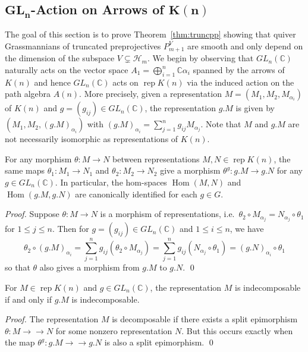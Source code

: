 \documentclass[smallextended,envcountsect,envcountsame]{svjour3}
\numberwithin{equation}{section}
\newcommand{\CC}{\mathbb{C}}
\newcommand{\cH}{\mathcal{H}}
\newcommand{\onto}{\to\!\!\!\!\!\to}
\newcommand{\Hom}{\operatorname{Hom}}
\newcommand{\rep}{\operatorname{rep}}
\begin{document}
\subsection{\texorpdfstring{$\mathbf{GL_n}$}{Gln}-Action on Arrows of \texorpdfstring{$\mathbf{K(n)}$}{K(n)}}

The goal of this section is to prove Theorem~\ref{thm:truncpp} showing that quiver Grassmannians of truncated preprojectives $P_{m+1}^V$ are smooth and only depend on the dimension of the subspace $V\subsetneq \cH_m$.
We begin by observing that $GL_n(\CC)$ naturally acts on the vector space $A_1=\bigoplus_{i=1}^n \CC\alpha_i$ spanned by the arrows of $K(n)$ and hence $GL_n(\CC)$ acts on $\rep K(n)$ via the induced action on the path algebra $A(n)$.
More precisely, given a representation $M=(M_1,M_2,M_{\alpha_i})$ of $K(n)$ and $g=(g_{ij})\in GL_n(\CC)$, the representation $g.M$ is given by $(M_1,M_2,(g.M)_{\alpha_i})$ with $(g.M)_{\alpha_i}=\sum\limits_{j=1}^n g_{ij}M_{\alpha_j}$.
Note that $M$ and $g.M$ are not necessarily isomorphic as representations of $K(n)$.
\begin{lemma}
  \label{le:hom equivariance}
  For any morphism $\theta:M\to N$ between representations $M,N\in\rep K(n)$, the same maps $\theta_1:M_1\to N_1$ and $\theta_2:M_2\to N_2$ give a morphism $\theta^g:g.M\to g.N$ for any $g\in GL_n(\CC)$.
  In particular, the hom-spaces $\Hom(M,N)$ and $\Hom(g.M,g.N)$ are canonically identified for each $g\in G$.
\end{lemma}
\begin{proof}
  Suppose $\theta:M\to N$ is a morphism of representations, i.e.\ $\theta_2\circ M_{\alpha_j}=N_{\alpha_j}\circ\theta_1$ for $1\le j\le n$.
  Then for $g=(g_{ij})\in GL_n(\CC)$ and $1\le i\le n$, we have
  \[\theta_2\circ (g.M)_{\alpha_i}=\sum\limits_{j=1}^n g_{ij}(\theta_2\circ M_{\alpha_j})=\sum\limits_{j=1}^n g_{ij}(N_{\alpha_j}\circ\theta_1)=(g.N)_{\alpha_i}\circ\theta_1\]
  so that $\theta$ also gives a morphism from $g.M$ to $g.N$. 
\qed\end{proof}
\begin{corollary}
  \label{cor:indecomposability}
  For $M\in\rep K(n)$ and $g\in GL_n(\CC)$, the representation $M$ is indecomposable if and only if $g.M$ is indecomposable.
\end{corollary}
\begin{proof}
  The representation $M$ is decomposable if there exists a split epimorphism $\theta:M\onto N$ for some nonzero representation $N$.
  But this occurs exactly when the map $\theta^g:g.M\onto g.N$ is also a split epimorphism.
\qed\end{proof}
\end{document}
